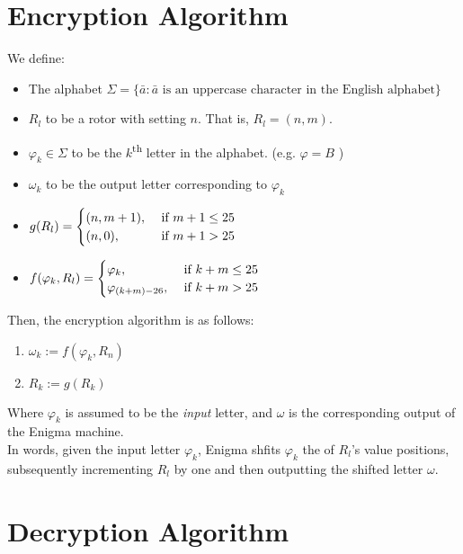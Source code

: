 \documentclass[12pt,a4paper]{article}
\begin{document}
	\section{Encryption Algorithm}
	We define:
		\begin{itemize}
			\item The alphabet $\Sigma = \{\bar{a}: \bar{a} \text{ is an uppercase character in the English alphabet} \}$
			\item $R_l$ to be a rotor with setting $n$. That is, $R_l = (n, m)$.
			\item $\varphi_k \in \Sigma$ to be the $k$\textsuperscript{th} letter in the alphabet. (e.g. $\varphi = B$ )
			\item $\omega_k$ to be the output letter corresponding to $\varphi_k$

			\item 
				$g(R_l) = \begin{cases}
					 (n, m+1), & \text{ if }  m+1 \leq 25 \cr
				        (n, 0), & \text{ if } {m+1} > 25 \cr 
				  \end{cases} 
				$
				
			\item 
					$f(\varphi_k, R_l) =	\begin{cases} 
						\varphi_{k}, & \text{ if } {k+m} \leq 25 \cr
						\varphi_{(k+m)-26}, & \text{ if }{k+m} > 25 \cr
					\end{cases}
					$ 
		\end{itemize}
	

	Then, the encryption algorithm is as follows:
	
	\begin{enumerate}
		\item $\omega_k := f(\varphi_k, R_n)$
		\item $R_k := g(R_k)$
	\end{enumerate}

	Where $\varphi_k$ is assumed to be the \emph{input} letter, and $\omega$ is the corresponding output of the Enigma machine. \\
	
	In words, given the input letter $\varphi_k$, Enigma shfits $\varphi_k$ the of $R_l$'s value positions, subsequently incrementing $R_l$ by one and then outputting the shifted letter $\omega$.

	\section{Decryption Algorithm}
\end{document}
